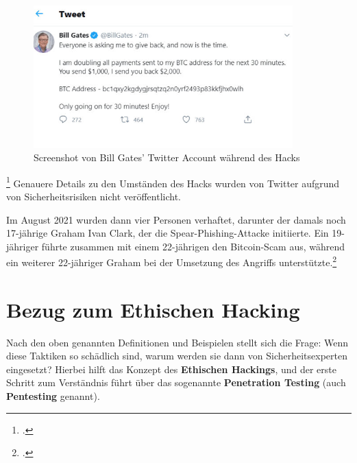 \documentclass[12pt, a4paper, oneside]{scrartcl}
\begin{document}
\begin{figure}[h!]
  \centering
  \includegraphics[width=10cm]{bill_hack.png}
  \caption[Screenshot von Bill Gates' Twitter Account während des Hacks]{Screenshot von Bill Gates' Twitter Account während des Hacks\footnotemark}
\end{figure}
\footcitetext{PicTwitterHack}
Genauere Details zu den Umständen des Hacks wurden von Twitter aufgrund von Sicherheitsrisiken nicht veröffentlicht. 
\par
Im August 2021 wurden dann vier Personen verhaftet, darunter der damals noch 17-jährige Graham Ivan Clark, 
der die Spear-Phishing-Attacke initiierte. Ein 19-jähriger führte zusammen mit einem 22-jährigen den 
Bitcoin-Scam aus, während ein weiterer 22-jähriger Graham bei der Umsetzung des Angriffs unterstützte.\footcite{teampw_TwitterPhishing}\\


\section{Bezug zum Ethischen Hacking}
Nach den oben genannten Definitionen und Beispielen stellt sich die Frage: Wenn diese Taktiken
so schädlich sind, warum werden sie dann von Sicherheitsexperten eingesetzt? Hierbei hilft das Konzept
des \textbf{Ethischen Hackings}, und der erste Schritt zum Verständnis führt über das sogenannte
\textbf{Penetration Testing} (auch \textbf{Pentesting} genannt).
\end{document}
